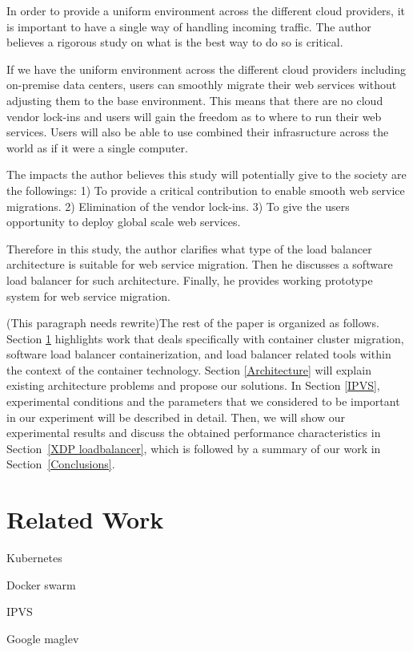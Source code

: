 In order to provide a uniform environment across the different cloud providers, it is important to have a single way of handling incoming traffic.
The author believes a rigorous study on what is the best way to do so is critical.

If we have the uniform environment across the different cloud providers including on-premise data centers, users can smoothly migrate their web services without adjusting them to the base environment.
This means that there are no cloud vendor lock-ins and users will gain the freedom as to where to run their web services.
Users will also be able to use combined their infrasructure across the world as if it were a single computer.

The impacts the author believes this study will potentially give to the society are the followings:
1) To provide a critical contribution to enable smooth web service migrations.
2) Elimination of the vendor lock-ins.
3) To give the users opportunity to deploy global scale web services.

Therefore in this study, the author clarifies what type of the load balancer architecture is suitable for web service migration. Then he discusses a software load balancer for such architecture. Finally, he provides working prototype system for web service migration.

(This paragraph needs rewrite)The rest of the paper is organized as follows.
Section \ref{Related Work} highlights work that deals specifically with container cluster migration, 
software load balancer containerization, and load balancer related tools within the context of the container technology. 
Section \ref{Architecture} will explain existing architecture problems and propose our solutions.
In Section \ref{IPVS}, experimental conditions and the parameters 
that we considered to be important in our experiment will be described in detail.
Then, we will show our experimental results and discuss the obtained performance characteristics in Section~\ref{XDP loadbalancer},  
which is followed by a summary of our work in Section~\ref{Conclusions}.

\section{Related Work}\label{Related Work}

Kubernetes

Docker swarm

IPVS

Google maglev

